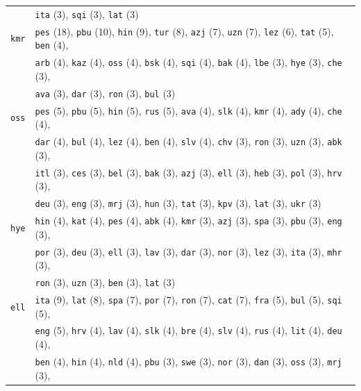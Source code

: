 \begin{center}
\begin{longtable}{ll}
 & \texttt{ita} (3), \texttt{sqi} (3), \texttt{lat} (3) \\
\texttt{kmr} & \texttt{pes} (18), \texttt{pbu} (10), \texttt{hin} (9), \texttt{tur} (8), \texttt{azj} (7), \texttt{uzn} (7), \texttt{lez} (6), \texttt{tat} (5), \texttt{ben} (4), \\
 & \texttt{arb} (4), \texttt{kaz} (4), \texttt{oss} (4), \texttt{bsk} (4), \texttt{sqi} (4), \texttt{bak} (4), \texttt{lbe} (3), \texttt{hye} (3), \texttt{che} (3), \\
 & \texttt{ava} (3), \texttt{dar} (3), \texttt{ron} (3), \texttt{bul} (3) \\
\texttt{oss} & \texttt{pes} (5), \texttt{pbu} (5), \texttt{hin} (5), \texttt{rus} (5), \texttt{ava} (4), \texttt{slk} (4), \texttt{kmr} (4), \texttt{ady} (4), \texttt{che} (4), \\
 & \texttt{dar} (4), \texttt{bul} (4), \texttt{lez} (4), \texttt{ben} (4), \texttt{slv} (4), \texttt{chv} (3), \texttt{ron} (3), \texttt{uzn} (3), \texttt{abk} (3), \\
 & \texttt{itl} (3), \texttt{ces} (3), \texttt{bel} (3), \texttt{bak} (3), \texttt{azj} (3), \texttt{ell} (3), \texttt{heb} (3), \texttt{pol} (3), \texttt{hrv} (3), \\
 & \texttt{deu} (3), \texttt{eng} (3), \texttt{mrj} (3), \texttt{hun} (3), \texttt{tat} (3), \texttt{kpv} (3), \texttt{lat} (3), \texttt{ukr} (3) \\
\texttt{hye} & \texttt{hin} (4), \texttt{kat} (4), \texttt{pes} (4), \texttt{abk} (4), \texttt{kmr} (3), \texttt{azj} (3), \texttt{spa} (3), \texttt{pbu} (3), \texttt{eng} (3), \\
 & \texttt{por} (3), \texttt{deu} (3), \texttt{ell} (3), \texttt{lav} (3), \texttt{dar} (3), \texttt{nor} (3), \texttt{lez} (3), \texttt{ita} (3), \texttt{mhr} (3), \\
 & \texttt{ron} (3), \texttt{uzn} (3), \texttt{ben} (3), \texttt{lat} (3) \\
\texttt{ell} & \texttt{ita} (9), \texttt{lat} (8), \texttt{spa} (7), \texttt{por} (7), \texttt{ron} (7), \texttt{cat} (7), \texttt{fra} (5), \texttt{bul} (5), \texttt{sqi} (5), \\
 & \texttt{eng} (5), \texttt{hrv} (4), \texttt{lav} (4), \texttt{slk} (4), \texttt{bre} (4), \texttt{slv} (4), \texttt{rus} (4), \texttt{lit} (4), \texttt{deu} (4), \\
 & \texttt{ben} (4), \texttt{hin} (4), \texttt{nld} (4), \texttt{pbu} (3), \texttt{swe} (3), \texttt{nor} (3), \texttt{dan} (3), \texttt{oss} (3), \texttt{mrj} (3), \\

\end{longtable}
\end{center}

